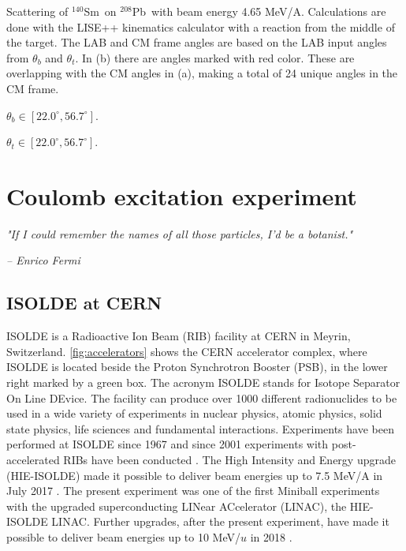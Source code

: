 \documentclass[twoside,english]{uiofysmaster/uiofysmaster}
\newcommand{\Sm}{$^{140}$Sm} %
\newcommand{\Pb}{$^{208}$Pb}
\let\orgautoref\autoref
\renewcommand{\autoref}
        {%
		 \def\sectionautorefname{Section}%
		 \def\subsectionautorefname{Section}%
		 \def\subsubsectionautorefname{Section}%
		 \def\chapterautorefname{Chapter}%
          \orgautoref}
\begin{document}
\begin{table}[htb] 
    \centering 
    \caption{Scattering of \Sm\ on \Pb\ with beam energy 4.65 MeV/A.
    Calculations are done with the LISE++ \cite{LISE} kinematics calculator with a reaction from the middle of the target.
    The LAB and CM frame angles are based on the LAB input angles from $\theta_b$ and $\theta_t$. 
    In (b) there are angles marked with red color. 
    These are overlapping with the CM angles in (a), making a total of 24 unique angles in the CM frame.}
	\label{tab:scattering}
    \begin{subtable}{0.45\textwidth}
    		\centering
		\caption{$\theta_b \in [22.0^\circ, 56.7^\circ]$.}
	 	\label{tab:LABvsCM_b}
	 	
	\end{subtable}
	\begin{subtable}{0.45\textwidth}
		\centering
		\caption{$\theta_t \in [22.0^\circ, 56.7^\circ]$.}
		\label{tab:LABvsCM_t}
		
	\end{subtable}
\end{table}



\chapter{Coulomb excitation experiment}
\epigraph{\textit{"If I could remember the names of all those particles, I'd be a botanist."}}{\textit{– Enrico Fermi}}

\section{ISOLDE at CERN}
ISOLDE is a Radioactive Ion Beam (RIB) facility at CERN in Meyrin, Switzerland. \autoref{fig:accelerators} shows the CERN accelerator complex, where ISOLDE is located beside the Proton Synchrotron Booster (PSB), in the lower right marked by a green box. The acronym ISOLDE stands for Isotope Separator On Line DEvice. The facility can produce over 1000 different radionuclides to be used in a wide variety of experiments in nuclear physics, atomic physics, solid state physics, life sciences and fundamental interactions. Experiments have been performed at ISOLDE since 1967 and since 2001 experiments with post-accelerated RIBs have been conducted  \cite{HIE-ISOLDE, ISOLDE-web, ISOLDE-facility}. 
The High Intensity and Energy upgrade (HIE-ISOLDE) made it possible to deliver beam energies up to 7.5 MeV/A in July 2017 \cite{CERN-news}. 
The present experiment was one of the first Miniball experiments with the upgraded superconducting LINear ACcelerator (LINAC), the HIE-ISOLDE LINAC. 
Further upgrades, after the present experiment, have made it possible to deliver beam energies up to 10 MeV/$u$ in 2018 \cite{HIE-ISOLDE}. 
\end{document}

